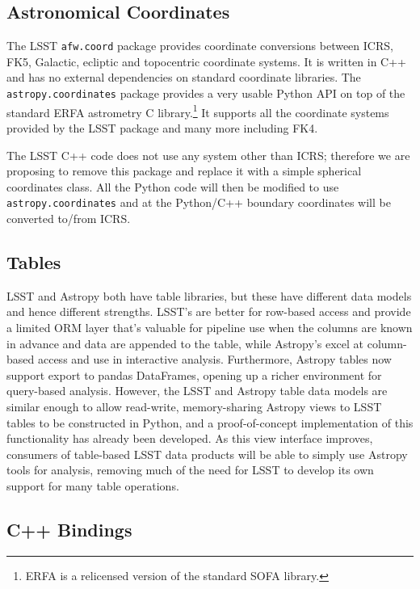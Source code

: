 \documentclass[]{spie}  %
\begin{document}
\subsection{Astronomical Coordinates}

The LSST \texttt{afw.coord} package provides coordinate conversions between ICRS, FK5, Galactic, ecliptic and topocentric coordinate systems.
It is written in C++ and has no external dependencies on standard coordinate libraries.
The \texttt{astropy.coordinates} package provides a very usable Python API on top of the standard ERFA astrometry C library.\footnote{ERFA is a relicensed version of the standard SOFA library\cite{2011SchpJ...611404H}.}
It supports all the coordinate systems provided by the LSST package and many more including FK4.

The LSST C++ code does not use any system other than ICRS; therefore we are proposing to remove this package and replace it with a simple spherical coordinates class.
All the Python code will then be modified to use \texttt{astropy.coordinates} and at the Python/C++ boundary coordinates will be converted to/from ICRS.

\subsection{Tables}

LSST and Astropy both have table libraries, but these have different data models and hence different strengths.
LSST's are better for row-based access and provide a limited ORM layer that's valuable for pipeline use when the columns are known in advance and data are appended to the table, while Astropy's excel at column-based access and use in interactive analysis.
Furthermore, Astropy tables now support export to pandas DataFrames\cite{mckinney-proc-scipy-2010}, opening up a richer environment for query-based analysis.
However, the LSST and Astropy table data models are similar enough to allow read-write, memory-sharing Astropy views to LSST tables to be constructed in Python, and a proof-of-concept implementation of this functionality has already been developed.
As this view interface improves, consumers of table-based LSST data products will be able to simply use Astropy tools for analysis, removing much of the need for LSST to develop its own support for many table operations.

\subsection{C++ Bindings}
\end{document}
